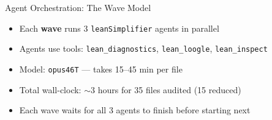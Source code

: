 \documentclass[aspectratio=169,10pt]{beamer}
\begin{document}
\begin{frame}{Agent Orchestration: The Wave Model}
    \vspace{-0.3em}
    {\small
    \begin{itemize}\itemsep0.1em
        \item Each \textbf{wave} runs 3 \texttt{leanSimplifier} agents in parallel
        \item Agents use tools: \texttt{lean\_diagnostics}, \texttt{lean\_loogle}, \texttt{lean\_inspect}
        \item Model: \texttt{opus46T} --- takes 15--45 min per file
        \item Total wall-clock: ${\sim}$3 hours for 35 files audited (15 reduced)
        \item Each wave waits for all 3 agents to finish before starting next
    \end{itemize}
    }
\end{frame}
\end{document}
